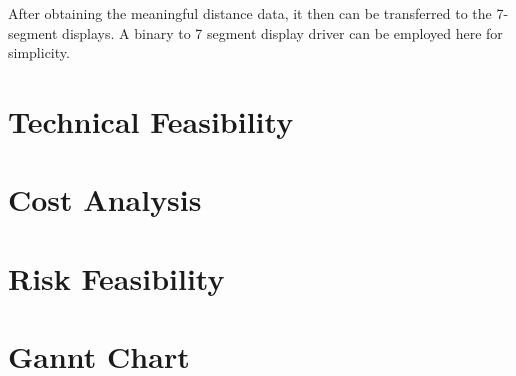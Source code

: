 \documentclass[12pt, a4paper]{article}
\begin{document}
        \bigskip
        After obtaining the meaningful distance data, it then can be transferred to the 7-segment displays. A binary to 7 segment display driver can be employed here for simplicity.


    \section{Technical Feasibility}
    
    \section{Cost Analysis}

    \section{Risk Feasibility}

    \section{Gannt Chart}
    


            
\end{document}
